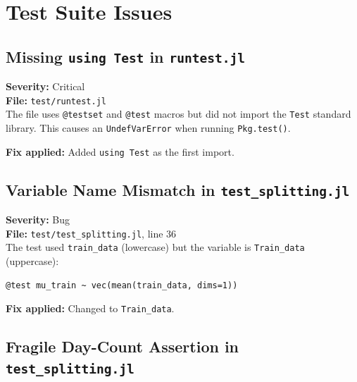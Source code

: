 \documentclass[11pt,a4paper]{article}
\begin{document}
\section{Test Suite Issues}

\subsection{Missing \texttt{using Test} in \texttt{runtest.jl}}
\label{sec:using-test}

\textbf{Severity:} Critical\\
\textbf{File:} \texttt{test/runtest.jl}\\[0.3em]
The file uses \texttt{@testset} and \texttt{@test} macros but did not import the
\texttt{Test} standard library. This causes an \texttt{UndefVarError} when running
\texttt{Pkg.test()}.

\textbf{Fix applied:} Added \texttt{using Test} as the first import.

\subsection{Variable Name Mismatch in \texttt{test\_splitting.jl}}
\label{sec:case-split}

\textbf{Severity:} Bug\\
\textbf{File:} \texttt{test/test\_splitting.jl}, line 36\\[0.3em]
The test used \texttt{train\_data} (lowercase) but the variable is
\texttt{Train\_data} (uppercase):

\begin{lstlisting}
@test mu_train ~ vec(mean(train_data, dims=1))
\end{lstlisting}

\textbf{Fix applied:} Changed to \texttt{Train\_data}.

\subsection{Fragile Day-Count Assertion in \texttt{test\_splitting.jl}}
\label{sec:daycount}
\end{document}
